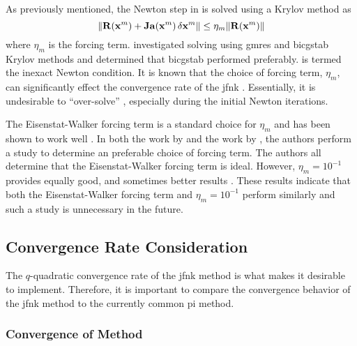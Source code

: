     As previously mentioned, the Newton step in  is solved
    using a Krylov method as
    \begin{equation}
      \label{eq:inexact_newton_condition}
      \| \mathbf{R}(\mathbf{x}^m) + \mathbf{Ja}(\mathbf{x}^m) \, \delta\mathbf{x}^m \| \le 
        \eta_m \| \mathbf{R}(\mathbf{x}^m) \|
    \end{equation}
    where $\eta_m$ is the forcing term. \citeauthor{qe2paper} investigated
    solving  using \gls{gmres} and
    \gls{bicgstab} Krylov methods and determined that \gls{bicgstab} performed
    preferably.  is termed the inexact Newton
    condition. It is known that the choice of forcing term, $\eta_m$, can
    significantly effect the convergence rate of the \gls{jfnk}
    \cite{textbookkelley}. Essentially, it is undesirable to ``over-solve''
    , especially during the initial Newton
    iterations.

    The Eisenstat-Walker forcing term is a standard choice for $\eta_m$ and has
    been shown to work well \cite{qe2paper,gill_azmy}. In both the work by
    \citeauthor{qe2paper} and the work by \citeauthor{gill_azmy}, the authors
    perform a study to determine an preferable choice of forcing term. The
    authors all determine that the Eisenstat-Walker forcing term is ideal.
    However, $\eta_m = 10^{-1}$ provides equally good, and sometimes better
    results \cite{qe2paper,gill_azmy,jfnk_wielandt,ma784notes}. These results 
    indicate that both the Eisenstat-Walker forcing term and $\eta_m = 10^{-1}$
    perform similarly and such a study is unnecessary in the future.

  \subsection{Convergence Rate Consideration}

    The $q$-quadratic convergence rate of the \gls{jfnk} method is what makes it
    desirable to implement. Therefore, it is important to compare the
    convergence behavior of the \gls{jfnk} method to the currently common
    \gls{pi} method.

    \subsubsection{Convergence of  Method}
      \label{sec:dominance_ratio}

